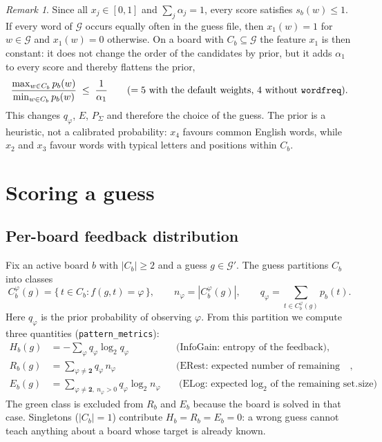 \documentclass[11pt,a4paper]{article}
\theoremstyle{definition}
\theoremstyle{remark}
\newtheorem*{remark}{Remark}
\newcommand{\G}{\mathcal{G}}
\newcommand{\green}{\mathbf{2}}
\begin{document}
\begin{remark}
Since all $x_j \in [0,1]$ and $\sum_j \alpha_j = 1$, every score satisfies $s_b(w) \le 1$.
If every word of $\G$ occurs equally often in the guess file, then $x_1(w) = 1$ for
$w \in \G$ and $x_1(w)=0$ otherwise. On a board with $C_b \subseteq \G$ the feature
$x_1$ is then constant: it does not change the order of the candidates by prior, but
it adds $\alpha_1$ to every score and thereby flattens the prior,
\[
  \frac{\max_{w \in C_b} p_b(w)}{\min_{w \in C_b} p_b(w)} \;\le\; \frac{1}{\alpha_1}
  \qquad (= 5 \text{ with the default weights, } 4 \text{ without \texttt{wordfreq}}).
\]
This changes $q_\varphi$, $E$, $P_\Sigma$ and therefore the choice of the guess.
The prior is a heuristic, not a calibrated probability: $x_4$ favours common English
words, while $x_2$ and $x_3$ favour words with typical letters and positions within $C_b$.
\end{remark}

\section{Scoring a guess}

\subsection{Per-board feedback distribution}

Fix an active board $b$ with $|C_b| \ge 2$ and a guess $g \in \G'$.
The guess partitions $C_b$ into classes
\[
  C_b^{\varphi}(g) = \{\, t \in C_b : f(g,t) = \varphi \,\},
  \qquad
  n_\varphi = |C_b^{\varphi}(g)|,
  \qquad
  q_\varphi = \sum_{t \in C_b^{\varphi}(g)} p_b(t).
\]
Here $q_\varphi$ is the prior probability of observing $\varphi$.
From this partition we compute three quantities (\texttt{pattern\_metrics}):
\begin{align*}
  H_b(g)        &= -\sum_{\varphi} q_\varphi \log_2 q_\varphi
                 && \text{(InfoGain: entropy of the feedback)},\\
  R_b(g)        &= \sum_{\varphi \neq \green} q_\varphi\, n_\varphi
                 && \text{(ERest: expected number of remaining candidates)},\\
  E_b(g)        &= \sum_{\varphi \neq \green,\ n_\varphi > 0} q_\varphi \log_2 n_\varphi
                 && \text{(ELog: expected $\log_2$ of the remaining set size)}.
\end{align*}
The green class is excluded from $R_b$ and $E_b$ because the board is solved in that case.
Singletons ($|C_b|=1$) contribute $H_b = R_b = E_b = 0$:
a wrong guess cannot teach anything about a board whose target is already known.
\end{document}
